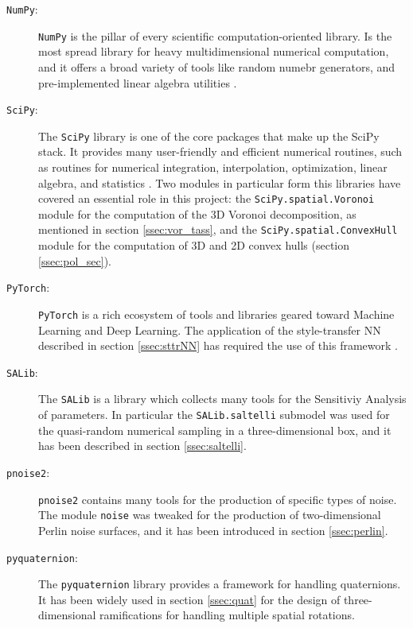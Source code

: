 \begin{description}
    \item [\texttt{NumPy}:] \texttt{NumPy} is the pillar of every scientific computation-oriented library. Is the most spread library for heavy multidimensional numerical computation, and it offers a broad variety of tools like random numebr generators, and pre-implemented linear algebra utilities \cite{oliphant2006guide}.

    \item [\texttt{SciPy}:] The \texttt{SciPy} library is one of the core packages that make up the SciPy stack. It provides many user-friendly and efficient numerical routines, such as routines for numerical integration, interpolation, optimization, linear algebra, and statistics \cite{2020SciPy-NMeth}. Two modules in particular form this libraries have covered an essential role in this project: the \texttt{SciPy.spatial.Voronoi} module for the computation of the 3D Voronoi decomposition, as mentioned in section \ref{ssec:vor_tass}, and the \texttt{SciPy.spatial.ConvexHull} module for the computation of 3D and 2D convex hulls (section \ref{ssec:pol_sec}).

    \item [\texttt{PyTorch}:] \texttt{PyTorch} is a rich ecosystem of tools and libraries geared toward Machine Learning and Deep Learning. The application of the style-transfer NN described in section \ref{ssec:sttrNN} has required the use of this framework \cite{NEURIPS2019_9015}.

    \item [\texttt{SALib}:] The \texttt{SALib} is a library which collects many tools for the Sensitiviy Analysis of parameters. In particular the \texttt{SALib.saltelli} submodel was used for the quasi-random numerical sampling in a three-dimensional box, and it has been described in section \ref{ssec:saltelli}.

    \item [\texttt{pnoise2}:] \texttt{pnoise2} contains many tools for the production of specific types of noise. The module \texttt{noise} was tweaked for the production of two-dimensional Perlin noise surfaces, and it has been introduced in section \ref{ssec:perlin}.

    \item [ \texttt{pyquaternion}:] The \texttt{pyquaternion} library provides a framework for handling quaternions. It has been widely used in section \ref{ssec:quat} for the design of three-dimensional ramifications for handling multiple spatial rotations.
\end{description}
